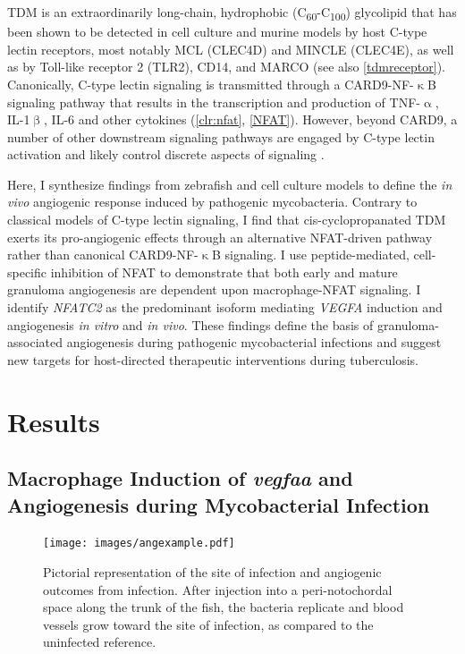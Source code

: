 TDM is an extraordinarily long\hyp{}chain, hydrophobic (C\textsubscript{60}\hyp{}C\textsubscript{100}) glycolipid \citep{Noll1956a, Noll1956b, Hunter2006a, Behling1993} that has been shown to be detected in cell culture and murine models by host C\hyp{}type lectin receptors, most notably MCL (CLEC4D) and MINCLE (CLEC4E), as well as by Toll\hyp{}like receptor 2 (TLR2), CD14, and MARCO \citep{Bowdish2009, Matsunaga2009, Miyake2013, Ishikawa2009} (see also \autoref{tdmreceptor}). Canonically, C\hyp{}type lectin signaling is transmitted through a CARD9\hyp{}NF\hyp{}$\upkappa$B signaling pathway that results in the transcription and production of TNF\hyp{}$\upalpha$, IL\hyp{}1$\upbeta$, IL\hyp{}6 and other cytokines \citep{Yamasaki2008, Goodridge2009, LobatoPascual2013, Zhao2014, Deerhake2021} (\autoref{clr:nfat}, \autoref{NFAT}). However, beyond CARD9, a number of other downstream signaling pathways are engaged by C\hyp{}type lectin activation and likely control discrete aspects of signaling \citep{Goodridge2007, Deerhake2021}.

Here, I synthesize findings from zebrafish and cell culture models to define the \textit{in vivo} angiogenic response induced by pathogenic mycobacteria. Contrary to classical models of C\hyp{}type lectin signaling, I find that cis\hyp{}cyclopropanated TDM exerts its pro\hyp{}angiogenic effects through an alternative NFAT\hyp{}driven pathway rather than canonical CARD9\hyp{}NF\hyp{}$\upkappa$B signaling. I use peptide\hyp{}mediated, cell\hyp{}specific inhibition of NFAT to demonstrate that both early and mature granuloma angiogenesis are dependent upon macrophage\hyp{}NFAT signaling. I identify \textit{NFATC2} as the predominant isoform mediating \textit{VEGFA} induction and angiogenesis \textit{in vitro} and \textit{in vivo}. These findings define the basis of granuloma\hyp{}associated angiogenesis during pathogenic mycobacterial infections and suggest new targets for host\hyp{}directed therapeutic interventions during tuberculosis.

\section{Results}

\subsection{Macrophage Induction of \textit{vegfaa} and Angiogenesis during Mycobacterial Infection}

\begin{figure}
\centering
\texttt{[image: images/angexample.pdf]}
\caption[Diagram of trunk injections in the larval zebrafish]{Pictorial representation of the site of infection and angiogenic outcomes from infection. After injection into a peri\hyp{}notochordal space along the trunk of the fish, the bacteria replicate and blood vessels grow toward the site of infection, as compared to the uninfected reference.}
\label{figure:angexample}

\end{figure}


